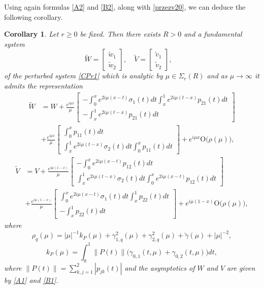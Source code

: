 \documentclass[11pt]{amsart}
\theoremstyle{plain}
\newtheorem{cor}[thm]{Corollary}
\theoremstyle{definition}
\theoremstyle{remark}
\numberwithin{equation}{section}
\begin{document}
Using again formulas
\eqref{A2} and \eqref{B2}, along with \eqref{przezv20}, we can deduce the following corollary.
\begin{cor}\label{C.7.3}
Let $r\geq 0$ be fixed. Then there exists $R>0$ and a fundamental system
\[
\widetilde{W}=\left[\begin{array}{c}
\tilde{w}_1\\
\tilde{w}_2\end{array}\right],\quad
\widetilde{V}=\left[\begin{array}{c}
\tilde{v}_1\\
\tilde{v}_2\end{array}\right],\quad
\]
of the perturbed system \eqref{CPr1} which is analytic by $\mu\in \Sigma_{r}(R)$ and as  $\mu\to\infty$ it admits the  representation
\begin{align*}
\widetilde{W}&=W+\frac{e^{i\mu x}}{\mu}\left[\begin{array}{c}
-\int_0^x e^{2i\mu(x-t)}\sigma_1(t)dt\int_x^1 e^{2i\mu(t-x)}p_{21}(t)dt\\
-\int_x^1 e^{2i\mu(t-x)}p_{21}(t)dt\end{array}\right]\\
&+\frac{e^{i\mu x}}{\mu}\left[\begin{array}{c}
\int_0^x p_{11}(t)dt\\
\int_x^1 e^{2i\mu(t-x)}\sigma_2(t)dt\int_0^x p_{11}(t)dt\end{array}\right]+
e^{i\mu x}\mbox{O}\big(\rho(\mu)\big),
\end{align*}
\begin{align*}
\widetilde{V}&=V+\frac{e^{i\mu(1-x)}}{\mu}\left[\begin{array}{c}
-\int_0^x e^{2i\mu(x-t)}p_{12}(t)dt\\
\int_x^1 e^{2i\mu(t-x)}\sigma_2(t)dt\int_0^x e^{2i\mu(x-t)}p_{12}(t)dt\end{array}\right]
\\&+\frac{e^{i\mu (1- x)}}{\mu}\left[\begin{array}{c}
\int_0^x e^{2i\mu(x-t)}\sigma_1(t)dt\int_x^1 p_{22}(t)dt\\
-\int_x^1 p_{22}(t)dt
\end{array}\right]+
e^{i\mu(1-x)}\mbox{O}\big(\rho(\mu)\big),
\end{align*}
where
\begin{equation}\label{rho}
  \rho_q(\mu)=|\mu|^{-1}k_P(\mu)+\gamma^2_{1,q}(\mu)+\gamma^2_{2,q}(\mu)+\widetilde{\gamma}(\mu)+|\mu|^{-2},
\end{equation}
$$k_P(\mu)= \int_0^1\|P(t)\|\Big(\gamma_{0,1}(t,\mu)+\gamma_{0,2}(t,\mu)\Big)dt,$$
where $\|P(t)\|=\sum_{k,j=1}^2 |p_{jk}(t)|$ and the asymptotics of $W$ and $V$ are given by \eqref{A1} and \eqref{B1}.
\end{cor}
\end{document}
